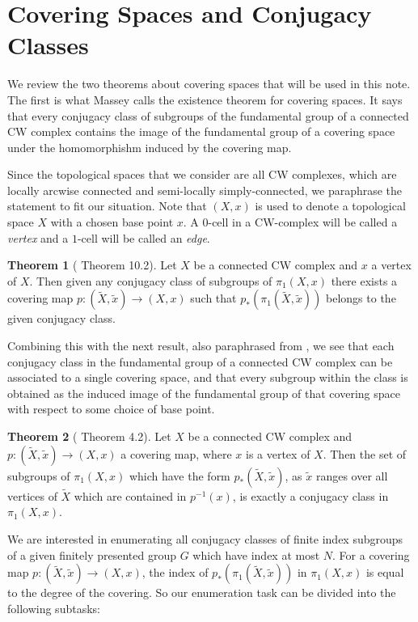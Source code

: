 \documentclass[12pt]{article}
\theoremstyle{definition}
\renewcommand{\tilde}{\widetilde}
\begin{document}
\section{Covering Spaces and Conjugacy Classes}\label{covers}

We review the two theorems about covering spaces that will be used in this note.
The first is what Massey calls the existence theorem for covering spaces.  It
says that every conjugacy class of subgroups of the fundamental group of a
connected CW complex contains the image of the fundamental group of a
covering space under the homomorphishm induced by the covering map.

Since the topological spaces that we consider are all CW complexes, which are
locally arcwise connected and semi-locally simply-connected, we paraphrase the
statement to fit our situation.  Note that $(X,x)$ is used to denote a
topological space $X$ with a chosen base point $x$.  A $0$-cell in a CW-complex
will be called a {\it vertex} and a $1$-cell will be called an {\it edge}.

\newtheorem*{thm}{Theorem}
\begin{thm}[\cite{Massey} Theorem 10.2]
  Let $X$ be a connected CW complex and $x$ a vertex of $X$.  Then given any
  conjugacy class of subgroups of $\pi_1(X, x)$ there exists a covering map
  $p:(\tilde X, \tilde x) \to (X, x)$ such that $p_*(\pi_1(\tilde X, \tilde x))$
  belongs to the given conjugacy class.
\end{thm}

Combining this with the next result, also paraphrased from \cite{Massey}, we see that
each conjugacy class in the fundamental group of a connected CW complex can be
associated to a single covering space, and that every subgroup within the class
is obtained as the induced image of the fundamental group of that covering space
with respect to some choice of base point.

\begin{thm}[\cite{Massey} Theorem 4.2]
  Let $X$ be a connected CW complex and $p:(\tilde X, \tilde x )\to(X, x)$ a
  covering map, where $x$ is a vertex of $X$. Then the set of subgroups of
  $\pi_1(X, x)$ which have the form $p_*(\tilde X, \tilde x)$, as $\tilde x$
  ranges over all vertices of $\tilde X$ which are contained in $p^{-1}(x)$, is
  exactly a conjugacy class in $\pi_1(X, x)$.
  \end{thm}

  We are interested in enumerating all conjugacy classes of finite index
  subgroups of a given finitely presented group $G$ which have index at most
  $N$.  For a covering map $p:(\tilde X, \tilde x)\to (X, x)$, the index of
  $p_*(\pi_1(\tilde X, \tilde x))$ in $\pi_1(X, x)$ is equal to the degree of
  the covering.  So our enumeration task can be divided into the following
  subtasks:
\end{document}
